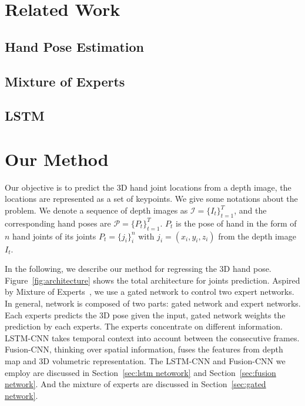 \documentclass[journal,comsoc]{IEEEtran}
\begin{document}

\section{Related Work}\label{sec:related work}
\subsection{Hand Pose Estimation}
\subsection{Mixture of Experts}
\subsection{LSTM}


\section{Our Method}\label{sec:our method}
Our objective is to predict the 3D hand joint locations from a depth image, the locations are represented as a set of keypoints.
We give some notations about the problem. We denote a sequence of depth images as $\mathcal{I}=\{I_t\}_{t=1}^T$,
and the corresponding hand poses are $\mathcal{P}=\{P_t\}_{t=1}^T$. $P_t$ is the pose of hand in the form of $n$
hand joints of its joints $P_t=\{j_i\}_i^n$ with $j_i=(x_i,y_i,z_i)$ from the depth image $I_t$.

In the following, we describe our method for regressing the 3D hand pose. Figure~\ref{fig:architecture} shows the total
architecture for joints prediction. Aspired by Mixture of Experts~\cite{jacobs1991adaptive}, we use a gated network to
control two expert networks. In general, network is composed of two parts: gated network and expert networks.
Each experts predicts the 3D pose given the input, gated network weights the prediction by each experts.
The experts concentrate on different information. LSTM-CNN takes temporal context into account between the consecutive frames.
Fusion-CNN, thinking over spatial information, fuses the features from depth map and 3D volumetric representation.
The LSTM-CNN and Fusion-CNN we employ are discussed in Section~\ref{sec:lstm netowork} and Section~\ref{sec:fusion network}.
And the mixture of experts are discussed in Section~\ref{sec:gated network}.
\end{document}
